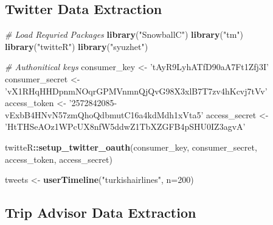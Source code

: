 \documentclass[]{article}
\newenvironment{Shaded}{\begin{snugshade}}{\end{snugshade}}
\newcommand{\KeywordTok}[1]{\textcolor[rgb]{0.13,0.29,0.53}{\textbf{#1}}}
\newcommand{\DataTypeTok}[1]{\textcolor[rgb]{0.13,0.29,0.53}{#1}}
\newcommand{\DecValTok}[1]{\textcolor[rgb]{0.00,0.00,0.81}{#1}}
\newcommand{\StringTok}[1]{\textcolor[rgb]{0.31,0.60,0.02}{#1}}
\newcommand{\CommentTok}[1]{\textcolor[rgb]{0.56,0.35,0.01}{\textit{#1}}}
\newcommand{\OperatorTok}[1]{\textcolor[rgb]{0.81,0.36,0.00}{\textbf{#1}}}
\newcommand{\NormalTok}[1]{#1}
\begin{document}
\subsection{Twitter Data Extraction}\label{twitter-data-extraction}

\begin{Shaded}
\begin{Highlighting}[]
\CommentTok{# Load Requried Packages}
\KeywordTok{library}\NormalTok{(}\StringTok{"SnowballC"}\NormalTok{)}
\KeywordTok{library}\NormalTok{(}\StringTok{"tm"}\NormalTok{)}
\KeywordTok{library}\NormalTok{(}\StringTok{"twitteR"}\NormalTok{)}
\KeywordTok{library}\NormalTok{(}\StringTok{"syuzhet"}\NormalTok{)}

\CommentTok{# Authonitical keys}
\NormalTok{consumer_key <-}\StringTok{ 'tAyR9LyhATfD90aA7Ft1Zfj3I'}
\NormalTok{consumer_secret <-}\StringTok{ 'vX1RHqHHDpnmNOqrGPMVnmnQjQvG98X3xlB7T7zv4hKcvj7tVv'}
\NormalTok{access_token <-}\StringTok{ '2572842085-vExbB4HNvN57zmQhoQdbmutC16a4kdMdh1xVta5'}
\NormalTok{access_secret <-}\StringTok{ 'HtTHSeAOz1WPcUX8nfW5ddwZ1TbXZGFB4pSHU0IZ3agvA'}

\NormalTok{twitteR}\OperatorTok{::}\KeywordTok{setup_twitter_oauth}\NormalTok{(consumer_key, consumer_secret, }
\NormalTok{                             access_token, access_secret)}

\NormalTok{tweets <-}\StringTok{ }\KeywordTok{userTimeline}\NormalTok{(}\StringTok{"turkishairlines"}\NormalTok{, }\DataTypeTok{n=}\DecValTok{200}\NormalTok{)}
\end{Highlighting}
\end{Shaded}

\subsection{Trip Advisor Data
Extraction}\label{trip-advisor-data-extraction}
\end{document}

